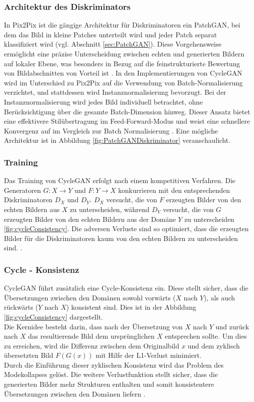 \subsubsection{Architektur des Diskriminators}
In Pix2Pix ist die gängige Architektur für Diskriminatoren ein PatchGAN, bei dem das Bild in kleine Patches unterteilt wird und jeder Patch separat klassifiziert wird (vgl. Abschnitt \ref{sec:PatchGAN}). Diese Vorgehensweise ermöglicht eine präzise Unterscheidung zwischen echten und generierten Bildern auf lokaler Ebene, was besonders in Bezug auf die feinstrukturierte Bewertung von Bildabschnitten von Vorteil ist \cite{Zhu.2017}.
\newline
In den Implementierungen von CycleGAN wird im Unterschied zu Pix2Pix auf die Verwendung von Batch-Normalisierung verzichtet, und stattdessen wird Instanznormalisierung bevorzugt. Bei der Instanznormalisierung wird jedes Bild individuell betrachtet, ohne Berücksichtigung über die gesamte Batch-Dimension hinweg. Dieser Ansatz bietet eine effektivere Stilübertragung im Feed-Forward-Modus und weist eine schnellere Konvergenz auf im Vergleich zur Batch Normalisierung \cite{Huang.2017}. Eine mögliche Architektur ist in Abbildung \ref{fig:PatchGANDiskriminator} veranschaulicht.

\subsubsection{Training}
Das Training von CycleGAN erfolgt nach einem kompetitiven Verfahren. Die Generatoren $G:X\rightarrow Y$ und $F:Y\rightarrow X$ konkurrieren mit den entsprechenden Diskriminatoren $D_X$ und $D_Y$. $D_X$ versucht, die von $F$ erzeugten Bilder von den echten Bildern aus $X$ zu unterscheiden, während $D_Y$ versucht, die von $G$ erzeugten Bilder von den echten Bildern aus der Domäne $Y$ zu unterscheiden \ref{fig:cycleConsistency}. Die adversen Verluste sind so optimiert, dass die erzeugten Bilder für die Diskriminatoren kaum von den echten Bildern zu unterscheiden sind. \cite{Zhu.2017}.

\subsubsection{Cycle - Konsistenz}
CycleGAN führt zusätzlich eine Cycle-Konsistenz ein. Diese stellt sicher, dass die Übersetzungen zwischen den Domänen sowohl vorwärts ($X$ nach $Y$), als auch rückwärts ($Y$ nach $X$) konsistent sind. Dies ist in der Abbildung \ref{fig:cycleConsistency} dargestellt.
\\
Die Kernidee besteht darin, dass nach der Übersetzung von $X$ nach $Y$ und zurück nach $X$ das resultierende Bild dem ursprünglichen $X$ entsprechen sollte. Um dies zu erreichen, wird die Differenz zwischen dem Originalbild $x$ und dem zyklisch übersetzten Bild $F(G(x))$ mit Hilfe der L1-Verlust minimiert. 
\\
Durch die Einführung dieser zyklischen Konsistenz wird das Problem des Modekollapses gelöst. Die weitere Verlustfunktion stellt sicher, dass die generierten Bilder mehr Strukturen enthalten und somit konsistentere Übersetzungen zwischen den Domänen liefern \cite{Zhu.2017}.

